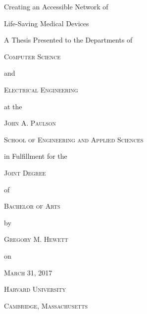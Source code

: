 \begin{titlepage}
	\centering
	
	\horrule{0.7pt} \par
    {\huge Creating an Accessible Network of \par}
    {\huge Life-Saving Medical Devices \par}
    \horrule{0.7pt} \par
    \vspace{1cm}
    
    {\large A Thesis Presented to the Departments of \par}
    \vspace{0.25cm}
    {\scshape \large Computer Science \par}
    and \par
    {\scshape \large Electrical Engineering \par}
    \vspace{0.75cm}
    
    at the \par
    \vspace{0.05cm}
    {\scshape \large John A. Paulson \par}
    {\scshape \large School of Engineering and Applied Sciences \par}
    \vspace{0.75cm}
    
    in Fulfillment for the \par
    \vspace{0.25cm}
    {\scshape \large Joint Degree \par}
    of \par
    {\scshape \large Bachelor of Arts \par}
    \vspace{0.75cm}
    
    by \par
    {\scshape \large Gregory M. Hewett \par}
    \vspace{0.5cm}
    
    on \par
    {\scshape \large March 31, 2017}
    
    \vfill
    
    {\scshape \large Harvard University \par}
    {\scshape \large Cambridge, Massachusetts}
\end{titlepage}